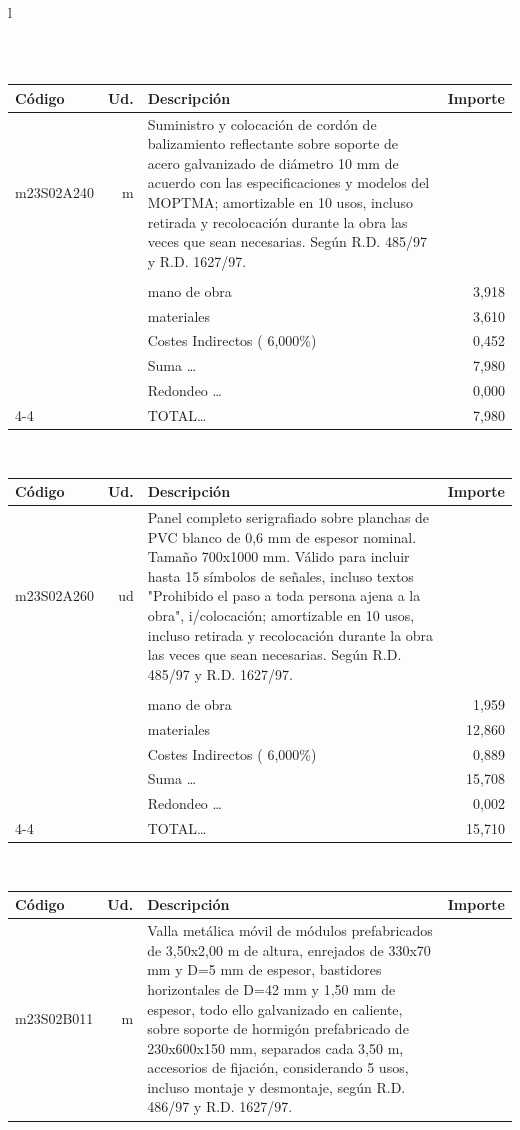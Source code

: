 \documentclass{book}%
\begin{document}
\begin{longtable}{l}
\begin{tabular}{l r p{60mm} r}
\end{tabular}\\%
\begin{tabular}{l r p{60mm} r}%
Código&Ud.&Descripción&Importe\\%
\hline%
m23S02A240&m&Suministro y colocación de cordón de balizamiento reflectante sobre soporte de acero galvanizado de diámetro 10 mm de acuerdo con las especificaciones y modelos del MOPTMA; amortizable en 10 usos, incluso retirada y recolocación durante la obra las veces que sean necesarias. Según R.D. 485/97 y R.D. 1627/97.&\\%
&&&\\%
&&mano de obra&     3,918\\%
&&materiales&     3,610\\%
&&Costes Indirectos (     6,000\%)&     0,452\\%
&&Suma \ldots&     7,980\\%
&&Redondeo \ldots&     0,000\\%
\cline{4-4}%
&&TOTAL\ldots&     7,980\\%
\end{tabular}\\%
\begin{tabular}{l r p{60mm} r}%
Código&Ud.&Descripción&Importe\\%
\hline%
m23S02A260&ud&Panel completo serigrafiado sobre planchas de PVC blanco de 0,6 mm de espesor nominal. Tamaño 700x1000 mm. Válido para incluir hasta 15 símbolos de señales, incluso textos "Prohibido el paso a toda persona ajena a la obra", i/colocación; amortizable en 10 usos, incluso retirada y recolocación durante la obra las veces que sean necesarias. Según R.D. 485/97 y R.D. 1627/97.&\\%
&&&\\%
&&mano de obra&     1,959\\%
&&materiales&    12,860\\%
&&Costes Indirectos (     6,000\%)&     0,889\\%
&&Suma \ldots&    15,708\\%
&&Redondeo \ldots&     0,002\\%
\cline{4-4}%
&&TOTAL\ldots&    15,710\\%
\end{tabular}\\%
\begin{tabular}{l r p{60mm} r}%
Código&Ud.&Descripción&Importe\\%
\hline%
m23S02B011&m&Valla metálica móvil de módulos prefabricados de 3,50x2,00 m de altura, enrejados de 330x70 mm y D=5 mm de espesor, bastidores horizontales de D=42 mm y 1,50 mm de espesor, todo ello galvanizado en caliente, sobre soporte de hormigón prefabricado de 230x600x150 mm, separados cada 3,50 m, accesorios de fijación, considerando 5 usos, incluso montaje y desmontaje, según R.D. 486/97 y R.D. 1627/97.&\\%

\end{tabular}
\end{longtable}
\end{document}
